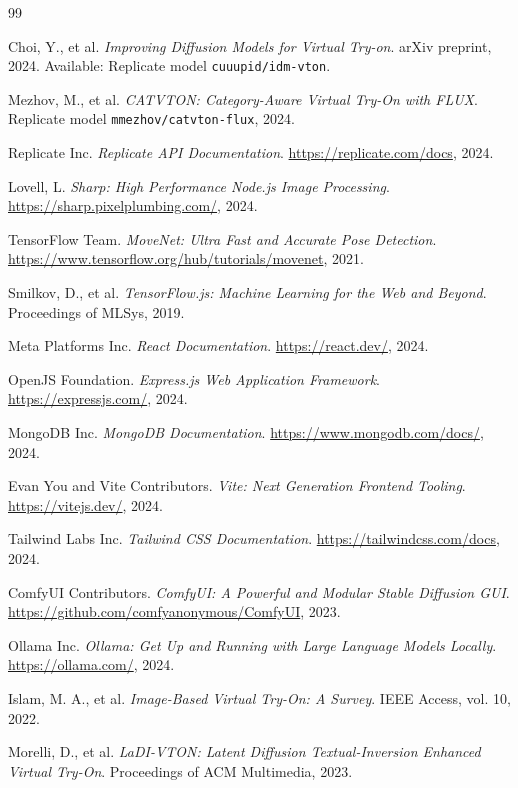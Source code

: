 \begin{thebibliography}{99}

Choi, Y., et al.
\textit{Improving Diffusion Models for Virtual Try-on}.
arXiv preprint, 2024.
Available: Replicate model \texttt{cuuupid/idm-vton}.

Mezhov, M., et al.
\textit{CATVTON: Category-Aware Virtual Try-On with FLUX}.
Replicate model \texttt{mmezhov/catvton-flux}, 2024.

Replicate Inc.
\textit{Replicate API Documentation}.
\url{https://replicate.com/docs}, 2024.

Lovell, L.
\textit{Sharp: High Performance Node.js Image Processing}.
\url{https://sharp.pixelplumbing.com/}, 2024.

TensorFlow Team.
\textit{MoveNet: Ultra Fast and Accurate Pose Detection}.
\url{https://www.tensorflow.org/hub/tutorials/movenet}, 2021.

Smilkov, D., et al.
\textit{TensorFlow.js: Machine Learning for the Web and Beyond}.
Proceedings of MLSys, 2019.

Meta Platforms Inc.
\textit{React Documentation}.
\url{https://react.dev/}, 2024.

OpenJS Foundation.
\textit{Express.js Web Application Framework}.
\url{https://expressjs.com/}, 2024.

MongoDB Inc.
\textit{MongoDB Documentation}.
\url{https://www.mongodb.com/docs/}, 2024.

Evan You and Vite Contributors.
\textit{Vite: Next Generation Frontend Tooling}.
\url{https://vitejs.dev/}, 2024.

Tailwind Labs Inc.
\textit{Tailwind CSS Documentation}.
\url{https://tailwindcss.com/docs}, 2024.

ComfyUI Contributors.
\textit{ComfyUI: A Powerful and Modular Stable Diffusion GUI}.
\url{https://github.com/comfyanonymous/ComfyUI}, 2023.

Ollama Inc.
\textit{Ollama: Get Up and Running with Large Language Models Locally}.
\url{https://ollama.com/}, 2024.

Islam, M. A., et al.
\textit{Image-Based Virtual Try-On: A Survey}.
IEEE Access, vol. 10, 2022.

Morelli, D., et al.
\textit{LaDI-VTON: Latent Diffusion Textual-Inversion Enhanced Virtual Try-On}.
Proceedings of ACM Multimedia, 2023.


\end{thebibliography}

